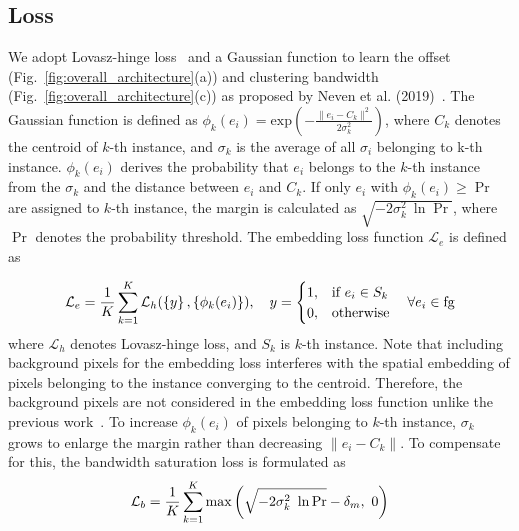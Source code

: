 \documentclass[runningheads]{llncs}
\begin{document}
\vspace*{-0.3cm}
\subsection{Loss}
\vspace*{-0.16cm}
We adopt Lovasz-hinge loss~\cite{yu2015lovsz} and a Gaussian function to learn the offset (Fig.~\ref{fig:overall_architecture}(a)) and clustering bandwidth (Fig.~\ref{fig:overall_architecture}(c)) as proposed by Neven et al. (2019)~\cite{neven2019instance}. The Gaussian function is defined as $\phi_k(e_i)=\text{exp}(-\frac{\|e_i-C_k\|^2}{2\sigma_k^{2}})$,
where $C_k$ denotes the centroid of $k$-th instance, and $\sigma_k$ is the average of all $\sigma_i$ belonging to k-th instance. $\phi_k(e_i)$ derives the probability that $e_i$ belongs to the $k$-th instance from the $\sigma_k$ and the distance between $e_i$ and $C_k$. If only $e_i$ with $\phi_k(e_i)\geq \Pr$ are assigned to $k$-th instance, the margin is calculated as $\sqrt{-2\sigma_k^{2}\ \ln\Pr}$, where $\Pr$ denotes the probability threshold. The embedding loss function $\mathcal{L}_e$ is defined as

\vspace*{-0.65cm}
\begin{equation} \label{eq:Loss_e}
\nonumber
\mathcal{L}_e = \frac{1}{K}\sum_{k=1}^{K}\mathcal{L}_h(\left\{y \right\}, \left\{ \phi_k(e_i) \right\}), \quad
y =\begin{cases}
 1, & \text{if $e_i \in S_k$}\\
 0, & \text{otherwise}
\end{cases} \quad
\forall e_i \in \text{fg}
\vspace*{-0.2cm}
\end{equation}
where $\mathcal{L}_h$ denotes Lovasz-hinge loss, and $S_k$ is $k$-th instance. Note that including background pixels for the embedding loss interferes with the spatial embedding of pixels belonging to the instance converging to the centroid. Therefore, the background pixels are not considered in the embedding loss function unlike the previous work~\cite{neven2019instance}. To increase $\phi_k(e_i)$ of pixels belonging to $k$-th instance, $\sigma_k$ grows to enlarge the margin rather than decreasing $\|e_i-C_k\|$.
To compensate for this, the bandwidth saturation loss is formulated as
\vspace*{-0.25cm}
\begin{equation} \label{eq:Loss_e}
\nonumber
\mathcal{L}_b = \frac{1}{K}\sum_{k=1}^{K} \text{max}\left( \sqrt{-2\sigma_k^{2}\ \ln\Pr} - \delta_m , \  0 \right)
\vspace*{-0.2cm}
\end{equation}
\end{document}

